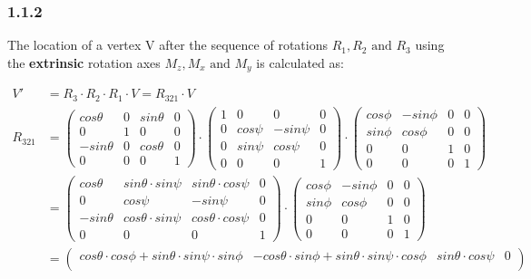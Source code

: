 \subsubsection*{1.1.2}

The location of a vertex V after the sequence of rotations $R_1, R_2 \text{ and } R_3$ using the \textbf{extrinsic} rotation axes $M_z, M_x \text{ and } M_y$ is calculated as:

\begin{align*}
V' &= R_3\cdot R_2\cdot R_1\cdot V = R_{321} \cdot V  \\
R_{321} &= 
\begin{pmatrix}
cos\theta & 0 & sin\theta & 0 \\
0 & 1 & 0 & 0 \\
-sin\theta & 0 & cos\theta & 0 \\
0 & 0 & 0 & 1 
\end{pmatrix}
\cdot
\begin{pmatrix}
1 & 0 & 0 & 0 \\
0 & cos\psi & -sin\psi & 0 \\
0 & sin\psi & cos\psi & 0 \\
0 & 0 & 0 & 1 
\end{pmatrix} 
\cdot
\begin{pmatrix}
cos\phi & -sin\phi & 0 & 0 \\
sin\phi & cos\phi & 0 & 0 \\
0 & 0 & 1 & 0 \\
0 & 0 & 0 & 1 
\end{pmatrix}\\
&=
\begin{pmatrix}
cos\theta & sin\theta \cdot sin\psi & sin\theta \cdot cos\psi& 0 \\
0 & cos\psi & -sin\psi & 0 \\
-sin\theta & cos\theta \cdot sin\psi & cos\theta \cdot cos\psi & 0 \\
0 & 0 & 0 & 1 
\end{pmatrix}
\cdot
\begin{pmatrix}
cos\phi & -sin\phi & 0 & 0 \\
sin\phi & cos\phi & 0 & 0 \\
0 & 0 & 1 & 0 \\
0 & 0 & 0 & 1 
\end{pmatrix}\\
&=
\begin{pmatrix}
cos\theta \cdot cos\phi + sin\theta \cdot sin\psi \cdot sin\phi  & -cos\theta \cdot sin\phi + sin\theta \cdot sin\psi \cdot cos\phi & sin\theta \cdot cos\psi& 0 \\

\end{pmatrix}
\end{align*}
